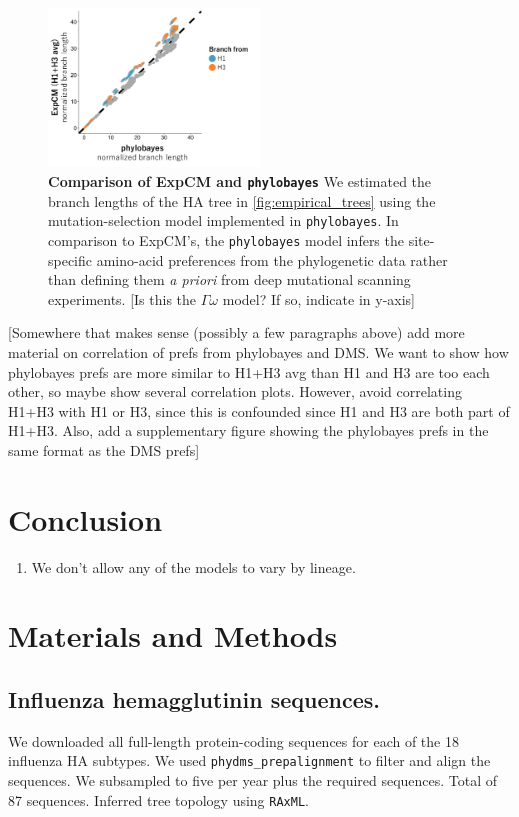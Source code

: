 \documentclass[11pt]{article}
\newcommand\jdbcomment[1]{{\color{red}[#1]}}
\begin{document}
\begin{figure}
\centerline{\includegraphics[width=0.5\textwidth]{figures/phylobayes.pdf}}
\caption{\label{fig:phylobayes}
\textbf{Comparison of ExpCM and \texttt{phylobayes}}
We estimated the branch lengths of the HA tree in \ref{fig:empirical_trees} using the mutation-selection model implemented in \texttt{phylobayes}. 
In comparison to ExpCM's, the \texttt{phylobayes} model infers the site-specific amino-acid preferences from the phylogenetic data rather than defining them \textit{a priori} from deep mutational scanning experiments. 
\jdbcomment{Is this the $\Gamma\omega$ model? If so, indicate in y-axis}
}
\end{figure}

\jdbcomment{Somewhere that makes sense (possibly a few paragraphs above) add more material on correlation of prefs from phylobayes and DMS. We want to show how phylobayes prefs are more similar to H1+H3 avg than H1 and H3 are too each other, so maybe show several correlation plots. However, avoid correlating H1+H3 with H1 or H3, since this is confounded since H1 and H3 are both part of H1+H3.
Also, add a supplementary figure showing the phylobayes prefs in the same format as the DMS prefs}

\section*{Conclusion}

\begin{enumerate}
  \item We don't allow any of the models to vary by lineage. 
\end{enumerate}

\newpage
\section*{Materials and Methods}

\subsection*{Influenza hemagglutinin sequences.}
We downloaded all full-length protein-coding sequences for each of the 18 influenza HA subtypes. 
We used \texttt{phydms\_prepalignment} \citep{hilton2017phydms} to filter and align the sequences. 
We subsampled to five per year plus the required sequences. 
Total of 87 sequences. 
Inferred tree topology using \texttt{RAxML}. 
\end{document}
